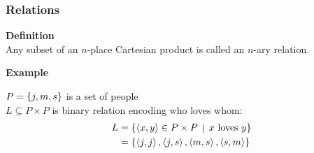\documentclass[fleqn,10pt,serif,xcolor=svgnames,xcolor=table,aspectratio=169]{beamer}
\begin{document}



\begin{frame}
  \frametitle{Relations}

  \textbf{{\color{themecolor}Definition}}\\
  Any subset of an $n$-place Cartesian product is called an $n$-ary relation.

  \bigskip

  \textbf{{\color{themecolor}Example}}\\
  \begin{minipage}{0.65\linewidth}
    $P = \left\{j,m,s\right\}$ is a set of people\\
    $L \subseteq P \times P$ is binary relation encoding who loves whom:
    \begin{align*}
      L & = \left\{\left \langle x,y\right\rangle \in P \times P \thinspace \mid \thinspace \text{$x$ loves $y$}\right\} \\
        & = \left\{\left \langle j,j\right\rangle, \left \langle j,s\right\rangle, \left \langle m,s\right\rangle, \left \langle s,m\right\rangle\right\}
    \end{align*}
  \end{minipage}
  \hfill
  \begin{minipage}{0.3\linewidth}
    \begin{center}
    \end{center}
  \end{minipage}

\end{frame}
\end{document}
